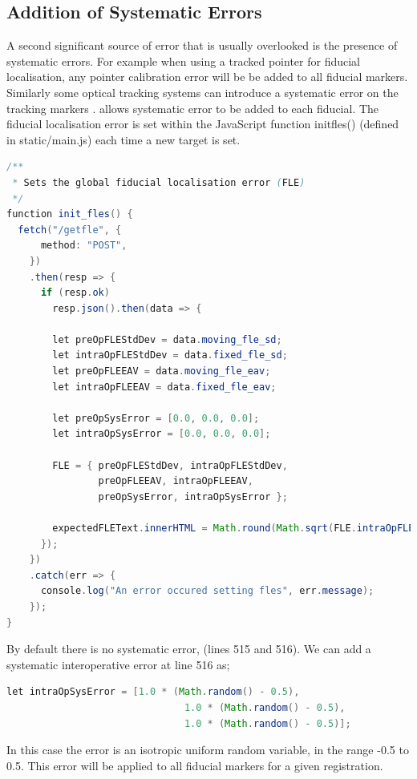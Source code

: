 \subsection{Addition of Systematic Errors}
\label{sec:sys_method}
A second significant source of error that is usually overlooked is the presence of systematic errors. For example when using a tracked pointer for fiducial localisation, 
any pointer calibration error will be be added to all fiducial markers.
Similarly some optical tracking systems can introduce a systematic error on 
the tracking markers \cite{6294449}. \fred allows systematic error to 
be added to each fiducial. The fiducial localisation error is set within 
the JavaScript function init{\textunderscore}fles()
(defined in static/main.js) each time a new target is set. 
\begin{lstlisting}[language=java, firstnumber = 496]
/**
 * Sets the global fiducial localisation error (FLE)
 */
function init_fles() {
  fetch("/getfle", {
      method: "POST",
    })
    .then(resp => {
      if (resp.ok)
        resp.json().then(data => {

        let preOpFLEStdDev = data.moving_fle_sd;
        let intraOpFLEStdDev = data.fixed_fle_sd;
        let preOpFLEEAV = data.moving_fle_eav;
        let intraOpFLEEAV = data.fixed_fle_eav;

        let preOpSysError = [0.0, 0.0, 0.0];
        let intraOpSysError = [0.0, 0.0, 0.0];

        FLE = { preOpFLEStdDev, intraOpFLEStdDev,
                preOpFLEEAV, intraOpFLEEAV,
                preOpSysError, intraOpSysError };

        expectedFLEText.innerHTML = Math.round(Math.sqrt(FLE.intraOpFLEEAV)*100)/100;
      });
    })
    .catch(err => {
      console.log("An error occured setting fles", err.message);
    });
}
\end{lstlisting}
By default there is no systematic error, (lines 515 and 516). We can 
add a systematic interoperative error at line 516 as; 

\begin{lstlisting}[language=java, firstnumber = 513]
        let intraOpSysError = [1.0 * (Math.random() - 0.5), 
                               1.0 * (Math.random() - 0.5), 
                               1.0 * (Math.random() - 0.5)];
\end{lstlisting}

In this case the error is an isotropic uniform random variable, in the range
-0.5 to 0.5. This error will be applied to all fiducial markers for a 
given registration. 


